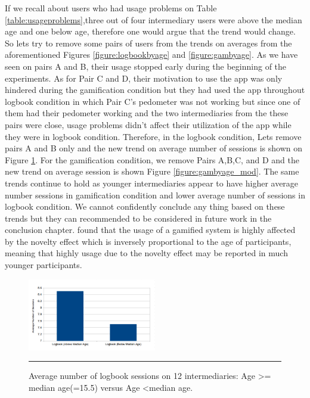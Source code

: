 If we recall about users who had usage problems on Table \ref{table:usageproblems},three out of four intermediary users were above the median age and one below age, therefore one would argue that the trend would change. So lets try to remove some pairs of users from the trends on averages from the aforementioned  Figures \ref{figure:logbookbyage} and \ref{figure:gambyage}. As we have seen on pairs A and B, their usage stopped early during the beginning of the experiments. As for Pair C and D, their motivation to use the app was only hindered during the  gamification condition but they had used the app throughout logbook condition in which Pair C's pedometer was not working but since one of them had their pedometer working and the two intermediaries from the these pairs were close, usage problems didn't affect their utilization of the app while they were in logbook condition. Therefore, in the logbook condition, Lets remove pairs A and B only and the new trend on average number of sessions is shown on Figure \ref{figure:logbookbyage_mod}. For the gamification condition, we remove Pairs A,B,C, and D and the new trend on average session is shown Figure \ref{figure:gambyage_mod}. The same trends continue to hold as younger intermediaries appear to have higher average number sessions in gamification condition and lower average number of sessions in logbook condition. We cannot confidently conclude any thing based on these trends but they can recommended to be considered in future work in the conclusion chapter. \cite{koivisto2014demographic} found that the usage of  a gamified system is highly affected by the novelty effect which is inversely proportional to the age of participants, meaning that highly usage due to the novelty effect may be reported in much younger participants.   
\newline
\begin{figure}[htbp]
  \centering
    \includegraphics[width=0.5\textwidth]{Figures/logbookbyage_mod.png}
    \rule{35em}{0.5pt}
  \caption{Average number of logbook sessions on  12 intermediaries: Age \textgreater= median age(=15.5) versus Age \textless median age.}
  \label{figure:logbookbyage_mod}
\end{figure}\newline
